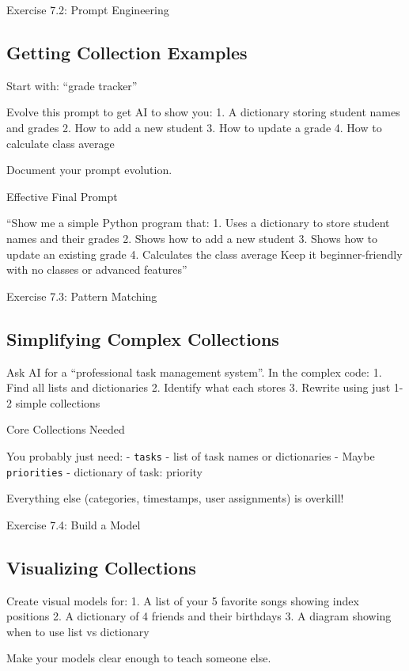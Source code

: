 \documentclass[
  letterpaper,
  DIV=11,
  numbers=noendperiod,
  oneside]{scrreprt}
\begin{document}
Exercise 7.2: Prompt Engineering

\subsection{Getting Collection
Examples}\label{getting-collection-examples}

Start with: ``grade tracker''

Evolve this prompt to get AI to show you: 1. A dictionary storing
student names and grades 2. How to add a new student 3. How to update a
grade 4. How to calculate class average

Document your prompt evolution.

Effective Final Prompt

``Show me a simple Python program that: 1. Uses a dictionary to store
student names and their grades 2. Shows how to add a new student 3.
Shows how to update an existing grade 4. Calculates the class average
Keep it beginner-friendly with no classes or advanced features''

Exercise 7.3: Pattern Matching

\subsection{Simplifying Complex
Collections}\label{simplifying-complex-collections}

Ask AI for a ``professional task management system''. In the complex
code: 1. Find all lists and dictionaries 2. Identify what each stores 3.
Rewrite using just 1-2 simple collections

Core Collections Needed

You probably just need: - \texttt{tasks} - list of task names or
dictionaries - Maybe \texttt{priorities} - dictionary of task: priority

Everything else (categories, timestamps, user assignments) is overkill!

Exercise 7.4: Build a Model

\subsection{Visualizing Collections}\label{visualizing-collections}

Create visual models for: 1. A list of your 5 favorite songs showing
index positions 2. A dictionary of 4 friends and their birthdays 3. A
diagram showing when to use list vs dictionary

Make your models clear enough to teach someone else.
\end{document}

